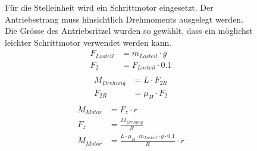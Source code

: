 \begin{figure}[h!]
    \begin{minipage}[hbt]{0.5\textwidth}
    	Für die Stelleinheit wird ein Schrittmotor eingesetzt. Der Antriebsstrang muss 
    	hinsichtlich Drehmoments ausgelegt werden. Die Grösse des Antriebsritzel wurden 
    	so gewählt, dass ein möglichst leichter Schrittmotor verwendet werden kann. 
    	\begin{align}
    	    F_{Losteil} &= m_{Losteil} \cdot g\\
    	    F_2 &= F_{Losteil} \cdot 0.1\\
    	\end{align}
    	\begin{align}
    	    M_{Drehung} &= L \cdot F_{2R}\\
    	    F_{2R} &= \mu_H \cdot F_2\\
    	\end{align}
    	\begin{align}
    	    M_{Motor} &= F_z \cdot r\\
    	    F_z &= \frac{M_{Drehung}}{R}\\
    	    M_{Motor} &=\frac{L \cdot \mu_H \cdot m_{Losteil} \cdot g \cdot 0.1}{R} \cdot r
    	\end{align}
    	

\end{minipage}
\end{figure}

